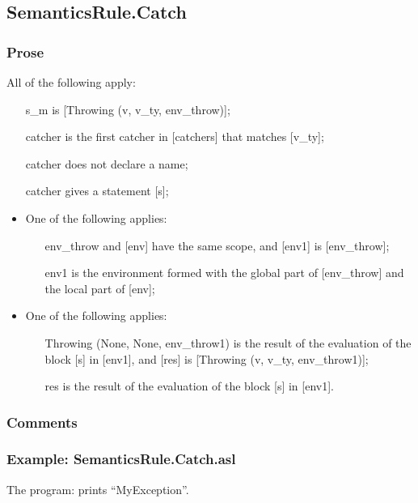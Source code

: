 \documentclass{book}
\begin{document}
\subsection{SemanticsRule.Catch \label{sec:SemanticsRule.Catch}}

    \subsubsection{Prose}
    All of the following apply:
    \begin{itemize}
    \item [s\_m] is [Throwing (v, v\_ty, env\_throw)];
    \item [catcher] is the first catcher in [catchers] that matches [v\_ty];
    \item [catcher] does not declare a name;
    \item [catcher] gives a statement [s];
    \item One of the following applies:
      \begin{itemize}
      \item [env\_throw] and [env] have the same scope, and [env1] is [env\_throw];
      \item [env1] is the environment formed with the global part of [env\_throw]
        and the local part of [env];
      \end{itemize}
    \item One of the following applies:
      \begin{itemize}
      \item [Throwing (None, None, env\_throw1)] is the result of the evaluation of
        the block [s] in [env1], and [res] is [Throwing (v, v\_ty, env\_throw1)];
      \item [res] is the result of the evaluation of the block [s] in [env1].
      \end{itemize}
    \end{itemize}

    \subsubsection{Comments}

    \subsubsection{Example: SemanticsRule.Catch.asl}
    The program:
    prints ``MyException''.
\end{document}

